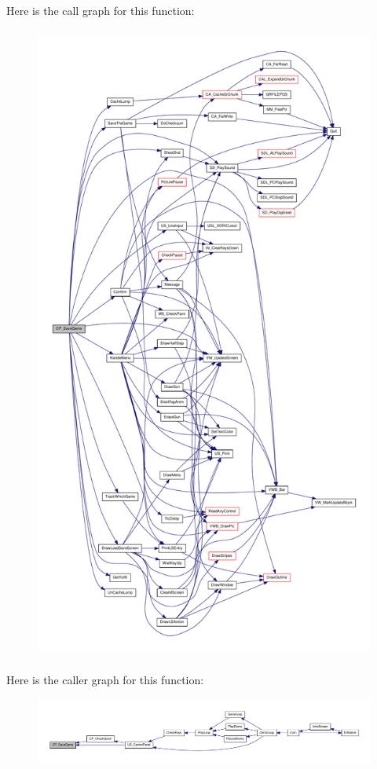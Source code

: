 Here is the call graph for this function:
\nopagebreak
\begin{figure}[H]
\begin{center}
\leavevmode
\includegraphics[height=600pt]{WL__MENU_8C_a62fb7c17655ed1e0031cbeafd182ee31_cgraph}
\end{center}
\end{figure}




Here is the caller graph for this function:
\nopagebreak
\begin{figure}[H]
\begin{center}
\leavevmode
\includegraphics[width=400pt]{WL__MENU_8C_a62fb7c17655ed1e0031cbeafd182ee31_icgraph}
\end{center}
\end{figure}


